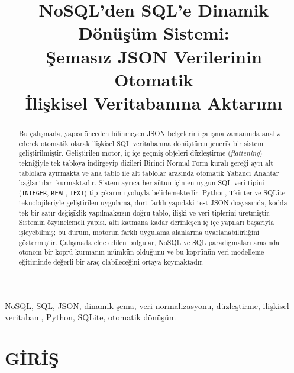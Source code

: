 \documentclass[conference,a4paper,10pt]{IEEEtran}
\begin{document}
\title{NoSQL'den SQL'e Dinamik Dönüşüm Sistemi:\\Şemasız JSON Verilerinin Otomatik\\İlişkisel Veritabanına Aktarımı}

\author{
}

\maketitle

\begin{abstract}
Bu çalışmada, yapısı önceden bilinmeyen JSON belgelerini çalışma zamanında analiz ederek otomatik olarak ilişkisel SQL veritabanına dönüştüren jenerik bir sistem geliştirilmiştir. Geliştirilen motor, iç içe geçmiş objeleri düzleştirme (\textit{flattening}) tekniğiyle tek tabloya indirgeyip dizileri Birinci Normal Form kuralı gereği ayrı alt tablolara ayırmakta ve ana tablo ile alt tablolar arasında otomatik Yabancı Anahtar bağlantıları kurmaktadır. Sistem ayrıca her sütun için en uygun SQL veri tipini (\texttt{INTEGER}, \texttt{REAL}, \texttt{TEXT}) tip çıkarımı yoluyla belirlemektedir. Python, Tkinter ve SQLite teknolojileriyle geliştirilen uygulama, dört farklı yapıdaki test JSON dosyasında, kodda tek bir satır değişiklik yapılmaksızın doğru tablo, ilişki ve veri tiplerini üretmiştir. Sistemin özyinelemeli yapısı, altı katmana kadar derinleşen iç içe yapıları başarıyla işleyebilmiş; bu durum, motorun farklı uygulama alanlarına uyarlanabilirliğini göstermiştir. Çalışmada elde edilen bulgular, NoSQL ve SQL paradigmaları arasında otonom bir köprü kurmanın mümkün olduğunu ve bu köprünün veri modelleme eğitiminde değerli bir araç olabileceğini ortaya koymaktadır.
\end{abstract}

\begin{IEEEkeywords}
NoSQL, SQL, JSON, dinamik şema, veri normalizasyonu, düzleştirme, ilişkisel veritabanı, Python, SQLite, otomatik dönüşüm
\end{IEEEkeywords}

\section{GİRİŞ}
\end{document}
